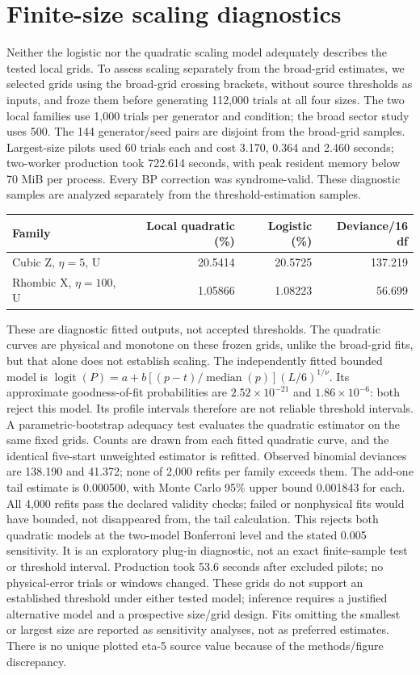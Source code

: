 \section{Finite-size scaling diagnostics}
Neither the logistic nor the quadratic scaling model adequately describes the tested local grids. To assess scaling separately from the broad-grid estimates, we selected grids using the broad-grid crossing brackets, without source thresholds as inputs, and froze them before generating 112,000 trials at all four sizes. The two local families use 1,000 trials per generator and condition; the broad sector study uses 500. The 144 generator/seed pairs are disjoint from the broad-grid samples. Largest-size pilots used 60 trials each and cost 3.170, 0.364 and 2.460 seconds; two-worker production took 722.614 seconds, with peak resident memory below 70 MiB per process. Every BP correction was syndrome-valid. These diagnostic samples are analyzed separately from the threshold-estimation samples.

\begin{center}
\begin{tabular}{lrrr}
\toprule Family & Local quadratic (\%) & Logistic (\%) & Deviance/16 df\\\midrule
Cubic Z, $\eta=5$, U & 20.5414 & 20.5725 & 137.219\\
Rhombic X, $\eta=100$, U & 1.05866 & 1.08223 & 56.699\\
\bottomrule
\end{tabular}
\end{center}
These are diagnostic fitted outputs, not accepted thresholds. The quadratic curves are physical and monotone on these frozen grids, unlike the broad-grid fits, but that alone does not establish scaling. The independently fitted bounded model is
$\operatorname{logit}(P)=a+b[(p-t)/\operatorname{median}(p)](L/6)^{1/\nu}$.
Its approximate goodness-of-fit probabilities are $2.52\times10^{-21}$ and $1.86\times10^{-6}$: both reject this model. Its profile intervals therefore are not reliable threshold intervals. A parametric-bootstrap adequacy test evaluates the quadratic estimator on the same fixed grids. Counts are drawn from each fitted quadratic curve, and the identical five-start unweighted estimator is refitted. Observed binomial deviances are 138.190 and 41.372; none of 2,000 refits per family exceeds them. The add-one tail estimate is 0.000500, with Monte Carlo 95\% upper bound 0.001843 for each. All 4,000 refits pass the declared validity checks; failed or nonphysical fits would have bounded, not disappeared from, the tail calculation. This rejects both quadratic models at the two-model Bonferroni level and the stated 0.005 sensitivity. It is an exploratory plug-in diagnostic, not an exact finite-sample test or threshold interval. Production took 53.6 seconds after excluded pilots; no physical-error trials or windows changed. These grids do not support an established threshold under either tested model; inference requires a justified alternative model and a prospective size/grid design. Fits omitting the smallest or largest size are reported as sensitivity analyses, not as preferred estimates. There is no unique plotted eta-5 source value because of the methods/figure discrepancy.

